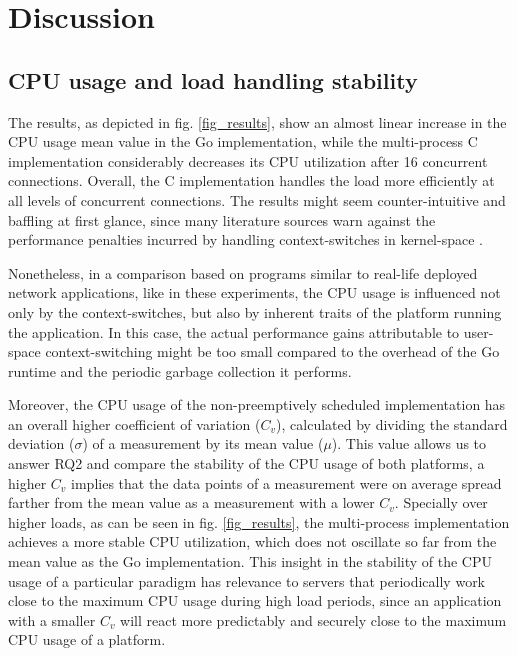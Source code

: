\section{Discussion}
\subsection{CPU usage and load handling stability}
The results, as depicted in fig. \ref{fig_results}, show an almost linear increase in the CPU usage mean value in the Go implementation, while the multi-process C implementation considerably decreases its CPU utilization after 16 concurrent connections. Overall, the C implementation handles the load more efficiently at all levels of concurrent connections. The results might seem counter-intuitive and baffling at first glance, since many literature sources warn against the performance penalties incurred by handling context-switches in kernel-space \cite{Cox-Buday2017}\cite{Kerrisk2010}. 

Nonetheless, in a comparison based on programs similar to real-life deployed network applications, like in these experiments, the CPU usage is influenced not only by the context-switches, but also by inherent traits of the platform running the application. In this case, the actual performance gains attributable to user-space context-switching might be too small compared to the overhead of the Go runtime and the periodic garbage collection it performs.

Moreover, the CPU usage of the non-preemptively scheduled implementation has an overall higher coefficient of variation ($C_v$), calculated by dividing the standard deviation ($\sigma$) of a measurement by its mean value ($\mu$). This value allows us to answer RQ2 and compare the stability of the CPU usage of both platforms, a higher $C_v$ implies that the data points of a measurement were on average spread farther from the mean value as a measurement with a lower $C_v$. Specially over higher loads, as can be seen in fig. \ref{fig_results}, the multi-process implementation achieves a more stable CPU utilization, which does not oscillate so far from the mean value as the Go implementation. This insight in the stability of the CPU usage of a particular paradigm has relevance to servers that periodically work close to the maximum CPU usage during high load periods, since an application with a smaller $C_v$ will react more predictably and securely close to the maximum CPU usage of a platform.

